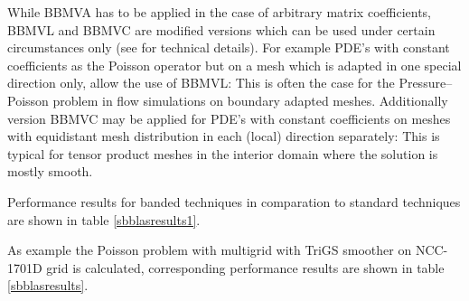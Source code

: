 While BBMVA has to be applied in the case of arbitrary matrix coefficients, BBMVL and BBMVC are 
modified versions which can be used under certain circumstances only (see \cite{Becker2003} for 
technical details). For example PDE's with constant coefficients as the Poisson operator but 
on a mesh which is adapted in one special direction only, allow the use of BBMVL: This is often the case for the 
Pressure--Poisson problem in flow simulations on boundary adapted meshes. 
Additionally version BBMVC may be applied for PDE's with constant coefficients on meshes with equidistant 
mesh distribution in each (local) direction separately: This is typical for tensor product meshes 
in the interior domain where the solution is mostly smooth.

Performance results for banded techniques in comparation to standard techniques are shown in table \ref{sbblasresults1}.

As example the Poisson problem with multigrid with TriGS smoother on NCC-1701D grid is calculated, corresponding
performance results are shown in table \ref{sbblasresults}.



